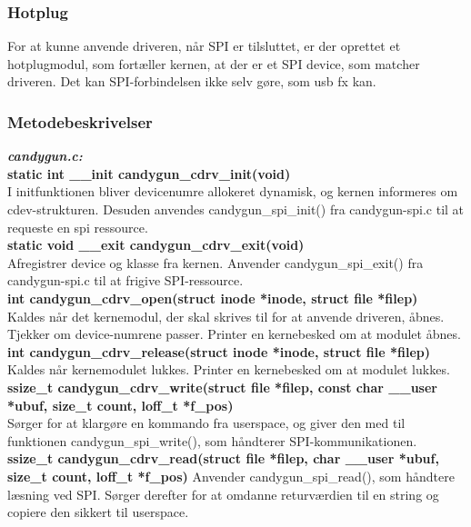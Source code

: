 \subsubsection{Hotplug}
For at kunne anvende driveren, når SPI er tilsluttet, er der oprettet et hotplugmodul, som fortæller kernen, at der er et SPI device, som matcher driveren. Det kan SPI-forbindelsen ikke selv gøre, som usb fx kan.

\subsubsection{Metodebeskrivelser}

\textit{\textbf{candygun.c:}} \\

\noindent\textbf{static int \_\_init candygun\_cdrv\_init(void)} \\
I initfunktionen bliver devicenumre allokeret dynamisk, og kernen informeres om cdev-strukturen. Desuden anvendes candygun\_spi\_init() fra candygun-spi.c til at requeste en spi ressource. \\

\noindent\textbf{static void \_\_exit candygun\_cdrv\_exit(void)}\\
Afregistrer device og klasse fra kernen. Anvender candygun\_spi\_exit() fra candygun-spi.c til at frigive SPI-ressource.\\

\noindent\textbf{int candygun\_cdrv\_open(struct inode *inode, struct file *filep)} \\
Kaldes når det kernemodul, der skal skrives til for at anvende driveren, åbnes. Tjekker om device-numrene passer. Printer en kernebesked om at modulet åbnes.\\

\noindent\textbf{int candygun\_cdrv\_release(struct inode *inode, struct file *filep)} \\
Kaldes når kernemodulet lukkes. Printer en kernebesked om at modulet lukkes.\\
 
\noindent\textbf{ssize\_t candygun\_cdrv\_write(struct file *filep, const char \_\_user *ubuf, size\_t count, loff\_t *f\_pos)} \\
Sørger for at klargøre en kommando fra userspace, og giver den med til funktionen candygun\_spi\_write(), som håndterer SPI-kommunikationen.\\

\noindent\textbf{ssize\_t candygun\_cdrv\_read(struct file *filep, char \_\_user *ubuf, size\_t count, loff\_t *f\_pos)}
Anvender candygun\_spi\_read(), som håndtere læsning ved SPI. Sørger derefter for at omdanne returværdien til en string og copiere den sikkert til userspace. \\

